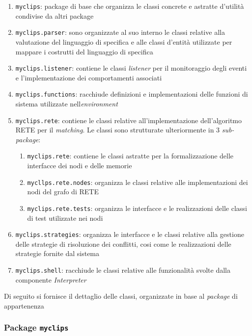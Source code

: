 \begin{enumerate}
	\item \texttt{myclips}: package di base che organizza le classi concrete e astratte d'utilità condivise da altri package
	\item \texttt{myclips.parser}: sono organizzate al suo interno le classi relative alla valutazione del linguaggio di specifica e alle classi d'entità utilizzate per mappare i costrutti del linguaggio di specifica
	\item \texttt{myclips.listener}: contiene le classi \emph{listener} per il monitoraggio degli eventi e l'implementazione dei comportamenti associati
	\item \texttt{myclips.functions}: racchiude definizioni e implementazioni delle funzioni di sistema utilizzate nell\emph{environment}
	\item \texttt{myclips.rete}: contiene le classi relative all'implementazione dell'algoritmo RETE per il \emph{matching}. Le classi sono strutturate ulteriormente in 3 \emph{sub-package}:
		\begin{enumerate}
			\item \texttt{myclips.rete}: contiene le classi astratte per la formalizzazione delle interfacce dei nodi e delle memorie
			\item \texttt{mycllps.rete.nodes}: organizza le classi relative alle implementazioni dei nodi del grafo di RETE
			\item \texttt{myclips.rete.tests}: organizza le interfacce e le realizzazioni delle classi di test utilizzate nei nodi
		\end{enumerate}
	\item \texttt{myclips.strategies}: organizza le interfacce e le classi relative alla gestione delle strategie di risoluzione dei conflitti, cosi come le realizzazioni delle strategie fornite dal sistema
	\item \texttt{myclips.shell}: racchiude le classi relative alle funzionalità svolte dalla componente \emph{Interpreter}
\end{enumerate}

Di seguito si fornisce il dettaglio delle classi, organizzate in base al \emph{package} di appartenenza

\subsubsection{Package \texttt{myclips}}

